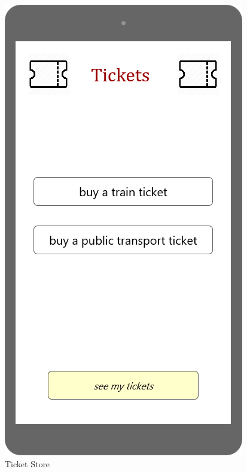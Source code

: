 \documentclass{article}
\begin{document}
\begin{figure}[H]
  \includegraphics[width=\linewidth]{01-Ticket_Store.png}
  \caption{Ticket Store}\label{fig:MU10}
\endminipage\hfill
{}

\end{figure}
\end{document}

